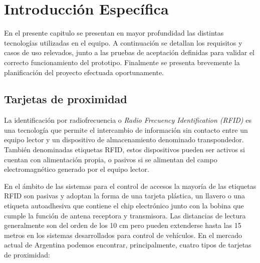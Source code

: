 \chapter{Introducción Específica} %

\label{Chapter2}

En el presente capitulo se presentan en mayor profundidad las distintas tecnologías utilizadas en el equipo. A continuación se detallan los requisitos y casos de uso relevados, junto a las pruebas de aceptación definidas para validar el correcto funcionamiento del prototipo. Finalmente se presenta brevemente la planificación del proyecto efectuada oportunamente.

\section{Tarjetas de proximidad}
\label{sec:tarjetas}

La identificación por radiofrecuencia o \emph{Radio Frecuency Identification (RFID)} es una tecnología que permite el intercambio de información sin contacto entre un equipo lector y un dispositivo de almacenamiento denominado transpondedor. También denominadas etiquetas RFID, estos dispositivos pueden ser activos si cuentan con alimentación propia, o pasivos si se alimentan del campo electromagnético generado por el equipo lector. 

En el ámbito de las sistemas para el control de accesos la mayoría de las etiquetas RFID son pasivas y adoptan la forma de una tarjeta plástica, un llavero o una etiqueta autoadhesiva que contiene el chip electrónico junto con la bobina que cumple la función de antena receptora y transmisora. Las distancias de lectura generalmente son del orden de los 10 cm pero pueden extenderse hasta las 15 metros en los sistemas desarrollados para control de vehículos. En el mercado actual de Argentina podemos encontrar, principalmente, cuatro tipos de tarjetas de proximidad:

